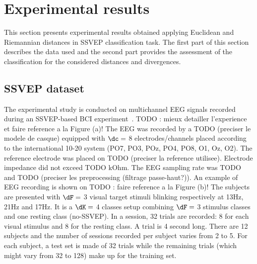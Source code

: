 \section{Experimental results}
\label{sec:expresults}
This section presents experimental results obtained applying Euclidean and Riemannian distances in SSVEP classification task. 
The first part of this section describes the data used and the second part provides the assessment of the classification for the considered distances and divergences. %

\subsection{SSVEP dataset}
The experimental study is conducted on multichannel EEG signals recorded during an SSVEP-based BCI experiment~\cite{kalunga_hybrid_2014}. TODO : mieux detailler l'experience et faire reference a la Figure (a)!
The EEG was recorded by a TODO (preciser le modele de casque) equipped with $\dc=$ 8 electrodes/channels placed according to the international 10-20 system (PO7, PO3, POz, PO4, PO8, O1, Oz, O2). The reference electrode was placed on TODO (preciser la reference utilisee). Electrode impedance did not exceed TODO kOhm. The EEG sampling rate was TODO and TODO (preciser les preprocessing (filtrage passe-haut?)). An example of EEG recording is shown on TODO : faire reference a la Figure (b)!
The subjects are presented with $\dF=$ 3 visual target stimuli blinking respectively at 13Hz, 21Hz and 17Hz. %
It is a $\dK=$ 4 classes setup combining $\dF=$ 3 stimulus classes and one resting class (no-SSVEP).
In a session, 32 trials are recorded: 8 for each visual stimulus and 8 for the resting class. 
A trial is 4 second long. 
There are 12 subjects and the number of sessions recorded per subject varies from 2 to 5.
For each subject, a test set is made of 32 trials while the remaining trials (which might vary from 32 to 128) make up for the training set.
